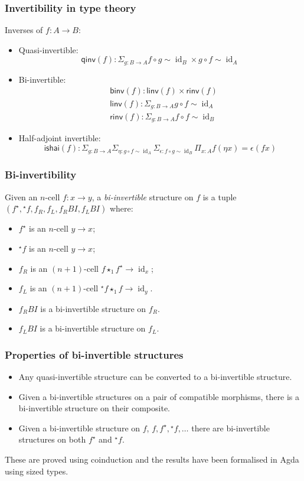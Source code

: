 \documentclass[presentation]{beamer}
\DeclareMathOperator{\id}{id}
\newcommand{\linv}[1]{{}^\star\!#1}
\newcommand{\rinv}[1]{#1^\star}
\newcommand{\comp}{\star}
\begin{document}
\begin{frame}
  \frametitle{Invertibility in type theory}
  Inverses of \(f : A \to B\):
  \begin{itemize}
  \item Quasi-invertible:
    \[ \mathsf{qinv}(f) : \Sigma_{g : B \to A} f \circ g \sim \id_B \times g \circ f \sim \id_A\]
  \item Bi-invertible:
    \begin{align*}
      &\mathsf{binv}(f) : \mathsf{linv}(f) \times \mathsf{rinv}(f) \\
      &\mathsf{linv}(f) : \Sigma_{g : B \to A} g \circ f \sim \id_A \\
      &\mathsf{rinv}(f) : \Sigma_{g : B \to A} f \circ f \sim \id_B
    \end{align*}
  \item Half-adjoint invertible:
    \[ \mathsf{ishai}(f) : \Sigma_{g : B \to A} \Sigma_{\eta : g \circ f \sim \id_A} \Sigma_{\epsilon : f \circ g \sim \id_B} \Pi_{x : A} f(\eta x) = \epsilon(f x) \]
  \end{itemize}
\end{frame}

\begin{frame}
  \frametitle{Bi-invertibility}
    Given an \(n\)-cell \(f : x \to y\), a \emph{bi-invertible} structure on \(f\) is a tuple \((\rinv f, \linv f, f_R, f_L, f_R{}BI, f_L{}BI)\) where:
  \begin{itemize}
  \item \(\rinv f\) is an \(n\)-cell \(y \to x\);
  \item \(\linv f\) is an \(n\)-cell \(y \to x\);
  \item \(f_R\) is an \((n+1)\)-cell \(f \comp_1 \rinv f \to \id_x\);
  \item \(f_L\) is an \((n+1)\)-cell \(\linv f \comp_1 f \to \id_y\).
  \item \(f_R{}BI\) is a bi-invertible structure on \(f_R\).
  \item \(f_L{}BI\) is a bi-invertible structure on \(f_L\).
  \end{itemize}
\end{frame}

\begin{frame}
  \frametitle{Properties of bi-invertible structures}
  \begin{itemize}
  \item Any quasi-invertible structure can be converted to a bi-invertible structure.
  \item Given a bi-invertible structures on a pair of compatible morphisms, there is a bi-invertible structure on their composite.
  \item Given a bi-invertible structure on \(f\), \(f, \rinv f, \linv f, \dots\) there are bi-invertible structures on both \(\rinv f\) and \(\linv f\).
  \end{itemize}
  \pause{}
  These are proved using coinduction and the results have been formalised in Agda using sized types.
\end{frame}
\end{document}
